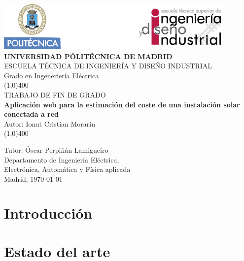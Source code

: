 \documentclass[11pt]{report}
\begin{document}
\begin{titlepage}



\begin{center}
	\includegraphics[scale=1]{cabecera}\\
	\vspace*{1cm}
	\Large{\textbf{\MakeUppercase{Universidad Pólitécnica de Madrid}}}\\[3mm]
	\Large{{\MakeUppercase{Escuela técnica de ingeniería y diseño industrial}}}\\[3mm]
	\Large {Grado en Ingeneriería Eléctrica}\\
	\vfill
	\line(1,0){400}\\
	\Large{{\MakeUppercase{Trabajo de fin de grado}}}\\
	\Huge{\textbf{Aplicación web para la estimación del coste de una instalación solar conectada a red}}\\[5mm]
	\Large{Autor: Ionut Cristian Morariu}\\
	\line(1,0){400}\\
	\vfill
\end{center}
\begin{flushright}
\Large {Tutor: Óscar Perpiñán Lamigueiro}\\[3mm]
\Large{Departamento de Ingeniería Eléctrica,\\ Electrónica, Automática y Física aplicada}\\[10mm]
Madrid, \today
\end{flushright}

\end{titlepage}

\renewcommand{\baselinestretch}{1.5} %
\renewcommand{\labelitemi}{\textbullet}

\tableofcontents
\thispagestyle{empty}
\clearpage

\setcounter{page}{1}


\chapter{Introducción}


\chapter{Estado del arte}

\end{document}
